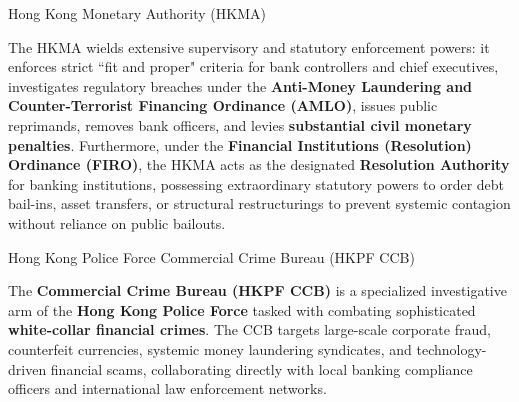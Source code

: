 \documentclass[10pt]{article}
\begin{document}
    \begin{core}[label=core:hkma]{Hong Kong Monetary Authority (HKMA)}


      The HKMA wields extensive supervisory and statutory enforcement powers: it enforces strict ``fit and proper" criteria for bank controllers and chief executives, investigates regulatory breaches under the \textbf{Anti-Money Laundering and Counter-Terrorist Financing Ordinance (AMLO)}, issues public reprimands, removes bank officers, and levies \textbf{substantial civil monetary penalties}. Furthermore, under the \textbf{Financial Institutions (Resolution) Ordinance (FIRO)}, the HKMA acts as the designated \textbf{Resolution Authority} for banking institutions, possessing extraordinary statutory powers to order debt bail-ins, asset transfers, or structural restructurings to prevent systemic contagion without reliance on public bailouts.

    \end{core}

    \begin{core}[label=core:hkpf_ccb]{Hong Kong Police Force Commercial Crime Bureau (HKPF CCB)}

      The \textbf{Commercial Crime Bureau (HKPF CCB)} is a specialized investigative arm of the \textbf{Hong Kong Police Force} tasked with combating sophisticated \textbf{white-collar financial crimes}. The CCB targets large-scale corporate fraud, counterfeit currencies, systemic money laundering syndicates, and technology-driven financial scams, collaborating directly with local banking compliance officers and international law enforcement networks.

    \end{core}
\end{document}
